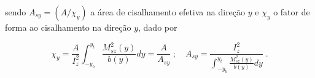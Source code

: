 \medskip

\noindent sendo \(A_{sy}=({A}/{\chi_y})\) a área de cisalhamento efetiva na direção \(y\) e \(\chi_y\) o fator de forma ao cisalhamento na direção \(y\), dado por

\[
	\chi_y
	=
	\frac{A}{I_z^2} \int_{-y_b}^{y_t}\frac{M_{sz}^2(y)}{b(y)} dy=\frac{A}{A_{sy}}
	\; ; \quad
	A_{sy}
	=
	\frac{I_z^2}{\int_{-y_b}^{y_t}\frac{M_{sz}^2(y)}{b(y)} dy}
	\; .
\]

